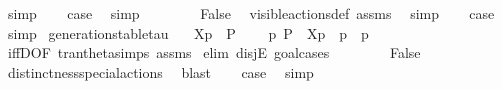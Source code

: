 \begin{isabellebody}
\ simp\isanewline
\ \ \isamarkupfalse%
\ {\isacharquery}{\kern0pt}case\ \isamarkupfalse%
\ simp\isanewline
{}\isamarkupfalse%
\isanewline
\ \ \isamarkupfalse%
\ {}\isanewline
\ \ \isamarkupfalse%
\ False\ \isamarkupfalse%
\ visible{\isacharunderscore}{\kern0pt}actions{\isacharunderscore}{\kern0pt}def\ assms{\isacharparenleft}{\kern0pt}{}{\isacharparenright}{\kern0pt}\ \isamarkupfalse%
\ simp\isanewline
\ \ \isamarkupfalse%
\ {\isacharquery}{\kern0pt}case\ \isamarkupfalse%
\ simp\isanewline
{}\isamarkupfalse%
%
\endisatagproof
{\isafoldproof}%
%
\isadelimproof
\isanewline
%
\endisadelimproof
\isanewline
{}\isamarkupfalse%
\ generation{\isacharunderscore}{\kern0pt}stable{\isacharunderscore}{\kern0pt}tau{\isacharcolon}{\kern0pt}\isanewline
\ \ \ {\isacartoucheopen}{\isasymtheta}{\isacharbrackleft}{\kern0pt}X{\isacharbrackright}{\kern0pt}{\isacharparenleft}{\kern0pt}p{\isacharparenright}{\kern0pt}\ {\isasymlongmapsto}\isactrlsup {\isasymtheta}{\isasymtau}\ P{\isacharprime}{\kern0pt}{\isacartoucheclose}\isanewline
\ \ \ {\isacartoucheopen}{\isasymexists}\ p{\isacharprime}{\kern0pt}{\isachardot}{\kern0pt}\ P{\isacharprime}{\kern0pt}\ {\isacharequal}{\kern0pt}\ {\isasymtheta}{\isacharbrackleft}{\kern0pt}X{\isacharbrackright}{\kern0pt}{\isacharparenleft}{\kern0pt}p{\isacharprime}{\kern0pt}{\isacharparenright}{\kern0pt}\ {\isasymand}\ p\ {\isasymlongmapsto}{\isasymtau}\ p{\isacharprime}{\kern0pt}{\isacartoucheclose}\isanewline
%
\isadelimproof
\ \ %
\endisadelimproof
%
\isatagproof
{}\isamarkupfalse%
\ iffD{}{\isacharbrackleft}{\kern0pt}OF\ tran{\isacharunderscore}{\kern0pt}theta{\isachardot}{\kern0pt}simps\ assms{\isacharbrackright}{\kern0pt}\isanewline
{}\isamarkupfalse%
\ {\isacharparenleft}{\kern0pt}elim\ disjE{\isacharcomma}{\kern0pt}\ goal{\isacharunderscore}{\kern0pt}cases{\isacharparenright}{\kern0pt}\isanewline
\ \ \isamarkupfalse%
\ {}\isanewline
\ \ \isamarkupfalse%
\ False\ \isamarkupfalse%
\ distinctness{\isacharunderscore}{\kern0pt}special{\isacharunderscore}{\kern0pt}actions\ \isamarkupfalse%
\ blast\isanewline
\ \ \isamarkupfalse%
\ {\isacharquery}{\kern0pt}case\ \isamarkupfalse%
\ simp\isanewline
{}\isamarkupfalse%
\isanewline
\ \ \isamarkupfalse%

\end{isabellebody}
